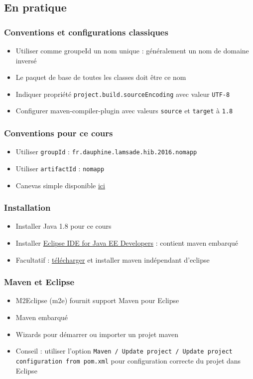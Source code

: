 \documentclass[english, french]{beamer}
\begin{document}
\subsection{En pratique}
\begin{frame}
	\frametitle{Conventions et configurations classiques}
	\begin{itemize}
		\item Utiliser comme groupeId un nom unique : généralement un nom de domaine inversé
		\item Le paquet de base de toutes les classes doit être ce nom
		\item Indiquer propriété \texttt{project.build.sourceEncoding} avec valeur \texttt{UTF-8}
		\item Configurer maven-compiler-plugin avec valeurs \texttt{source} et \texttt{target} à \texttt{1.8}
	\end{itemize}
\end{frame}

\begin{frame}
	\frametitle{Conventions pour ce cours}
	\begin{itemize}
		\item Utiliser \texttt{groupId} : \texttt{fr.dauphine.lamsade.hib.2016.nomapp}
		\item Utiliser \texttt{artifactId} : \texttt{nomapp}
		\item Canevas simple disponible \href{https://github.com/oliviercailloux/jee/tree/master/Sample/pom.xml}{ici}
	\end{itemize}
\end{frame}

\begin{frame}
	\frametitle{Installation}
	\begin{itemize}
		\item Installer Java 1.8 pour ce cours
		\item Installer \href{https://www.eclipse.org/downloads/}{Eclipse IDE for Java EE Developers} : contient maven embarqué
		\item Facultatif : \href{https://maven.apache.org/download.cgi}{télécharger} et installer maven indépendant d’eclipse
	\end{itemize}
\end{frame}

\begin{frame}
	\frametitle{Maven et Eclipse}
	\begin{itemize}
		\item M2Eclipse (m2e) fournit support Maven pour Eclipse
		\item Maven embarqué
		\item Wizards pour démarrer ou importer un projet maven
		\item Conseil : utiliser l’option \texttt{Maven / Update project / Update project configuration from pom.xml} pour configuration correcte du projet dans Eclipse
	\end{itemize}
\end{frame}
\end{document}
